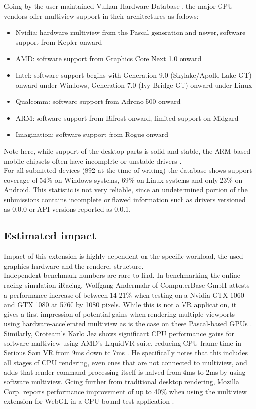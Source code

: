 Going by the user-maintained Vulkan Hardware Database \cite{Willems.2020}, the major GPU vendors offer multiview support in their architectures as follows: 
\begin{itemize}
\item Nvidia: hardware multiview from the Pascal generation and newer, software support from Kepler onward
\item AMD: software support from Graphics Core Next 1.0 onward
\item Intel: software support begins with Generation 9.0 (Skylake/Apollo Lake GT) onward under Windows, Generation 7.0 (Ivy Bridge GT) onward under Linux
\item Qualcomm: software support from Adreno 500 onward
\item ARM: software support from Bifrost onward, limited support on Midgard
\item Imagination: software support from Rogue onward
\end{itemize}
Note here, while support of the desktop parts is solid and stable, the ARM-based mobile chipsets often have incomplete or unstable drivers \cite{Willems.2019}\cite{JMC47.2018}. \\
For all submitted devices (892 at the time of writing) the database shows support coverage of 54\% on Windows systems, 69\% on Linux systems and only 23\% on Android. This statistic is not very reliable, since an undetermined portion of the submissions contains incomplete or flawed information such as drivers versioned as 0.0.0 or API versions reported as 0.0.1. 

\subsection{Estimated impact}
Impact of this extension is highly dependent on the specific workload, the used graphics hardware and the renderer structure. \\
Independent benchmark numbers are rare to find. In benchmarking the online racing simulation iRacing, Wolfgang Andermahr of ComputerBase GmbH attests a performance increase of between 14-21\% when testing on a Nvidia GTX 1060 and GTX 1080 at 5760 by 1080 pixels. While this is not a VR application, it gives a first impression of potential gains when rendering multiple viewports using hardware-accelerated multiview as is the case on these Pascal-based GPUs \cite{Andermahr.2016}.
Similarly, Croteam's Karlo Jez shows significant CPU performance gains for software multiview using AMD's LiquidVR suite, reducing CPU frame time in Serious Sam \gls{VR} from 9ms down to 7ms \cite{Jez.2017}. He specifically notes that this includes all stages of CPU rendering, even ones that are not connected to multiview, and adds that render command processing itself is halved from 4ms to 2ms by using software multiview. 
Going further from traditional desktop rendering, Mozilla Corp. reports performance improvement of up to 40\% when using the multiview extension for WebGL in a CPU-bound test application \cite{Serrano.2019}. 

